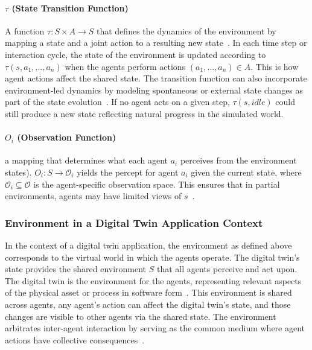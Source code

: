 \paragraph{$\tau$ (State Transition Function)} A function $\tau: S \times A \to S$ that defines the dynamics of the environment by mapping a state and a joint action to a resulting new state~\cite{zhang2020transfer}. In each time step or interaction cycle, the state of the environment is updated according to $\tau(s, a_1,\dots,a_n)$ when the agents perform actions $(a_1,\dots,a_n) \in A$. This is how agent actions affect the shared state. The transition function can also incorporate environment-led dynamics by modeling spontaneous or   external state changes as part of the state evolution~\cite{belenguix2007formalmodel}. If no agent acts on a given step, $\tau(s, \textit{idle})$ could still produce a new state reflecting natural progress in the simulated world.

\paragraph{$O_i$ (Observation Function)} a mapping that determines what each agent $a_i$ perceives from the environment states). $O_i: S \to \mathcal{O}_i$ yields the percept for agent $a_i$ given the current state, where $\mathcal{O}_i \subseteq \mathcal{O}$ is the agent-specific observation space. This ensures that in partial environments, agents may have limited views of $s$~\cite{weyns2007environment}.


\subsubsection{Environment in a Digital Twin Application Context}

In the context of a digital twin application, the environment as defined above corresponds to the virtual world in which the agents operate. The digital twin’s state provides the shared environment $S$ that all agents perceive and act upon. The digital twin is the environment for the agents, representing relevant aspects of the physical asset or process in software form~\cite{Lee2025DigitalTwins}. This environment is shared across agents, any agent’s action can affect the digital twin’s state, and those changes are visible to other agents via the shared state. The environment arbitrates inter-agent interaction by serving as the common medium where agent actions have collective consequences~\cite{weyns2007environment}.


